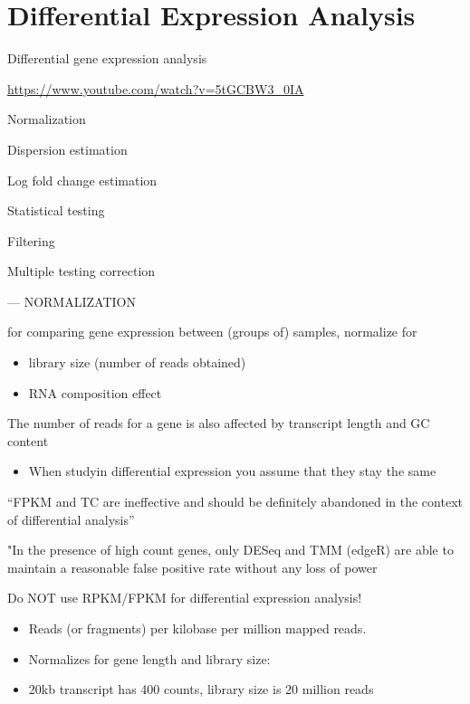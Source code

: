 \documentclass[
]{book}
\providecommand{\tightlist}{%
  \setlength{\itemsep}{0pt}\setlength{\parskip}{0pt}}
\begin{document}
\hypertarget{differential-expression-analysis}{%
\section{Differential Expression Analysis}\label{differential-expression-analysis}}

Differential gene expression analysis

\url{https://www.youtube.com/watch?v=5tGCBW3_0IA}

Normalization

Dispersion estimation

Log fold change estimation

Statistical testing

Filtering

Multiple testing correction

--- NORMALIZATION

for comparing gene expression between (groups of) samples, normalize for

\begin{itemize}
\item
  library size (number of reads obtained)
\item
  RNA composition effect
\end{itemize}

The number of reads for a gene is also affected by transcript length and GC content

\begin{itemize}
\tightlist
\item
  When studyin differential expression you assume that they stay the same
\end{itemize}

``FPKM and TC are ineffective and should be definitely abandoned in the context of differential analysis''

"In the presence of high count genes, only DESeq and TMM (edgeR) are able to maintain a reasonable false positive rate without any loss of power

Do NOT use RPKM/FPKM for differential expression analysis!

\begin{itemize}
\item
  Reads (or fragments) per kilobase per million mapped reads.
\item
  Normalizes for gene length and library size:
\item
  20kb transcript has 400 counts, library size is 20 million reads
\end{itemize}
\end{document}
